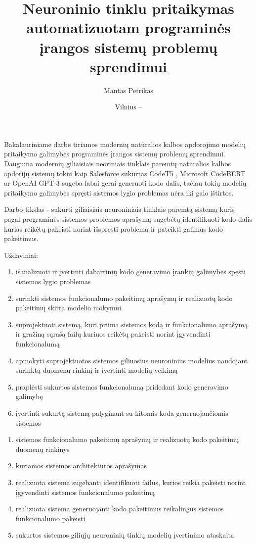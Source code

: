 \documentclass{VUMIFPSbakalaurinis}
\title{Neuroninio tinklu pritaikymas automatizuotam programinės įrangos sistemų problemų sprendimui}
\author{Mantas Petrikas}
\date{Vilnius – \the\year}
\begin{document}
\maketitle



Bakalauriniame darbe tiriamos modernių natūralios kalbos apdorojimo modelių pritaikymo galimybės programinės įrangos sistemų problemų sprendimui. 
Dauguma modernių giliaisiais neoriniais tinklais paremtų natūralios kalbos apdorijų sistemų tokiu kaip Salesforce sukurtas CodeT5 \cite{wang2021codet5}, Microsoft CodeBERT \cite{feng2020codebert} ar OpenAI GPT-3 \cite{brown2020language} sugeba labai gerai generuoti kodo dalis,
tačiau tokių modelių pritaikymo galimybės spręsti sistemos lygio problemas nėra iki galo ištirtos.


Darbo tikslas - sukurti giliaisiais neuroniniais tinklais paremtą sistemą kuris pagal programinės sistemos problemos aprašymą sugebėtų identifikuoti kodo dalis kurias reikėtų pakeisti norint išspręsti problemą ir pateikti galimus kodo pakeitimus.

Uždaviniai:
\begin{enumerate}
    \item išanalizuoti ir įvertinti dabartinių kodo generavimo įrankių galimybės spęsti sistemos lygio problemas
    \item surinkti sistemos funkcionalumo pakeitimų aprašymų ir realizuotų kodo pakeitimų skirta modelio mokymui
    \item suprojektuoti sistemą, kuri priima sistemos kodą ir funkcionalumo aprašymą ir gražiną sąrašą failų kuriuos reikėtų pakeisti norint įgyvendinti funkcionalumą
    \item apmokyti suprojektuotos sistemos giliuosius neuroninius modelius naudojant surinktą duomenų rinkinį ir įvertinti modelių veikimą
    \item praplėsti sukurtos sistemos funkcionalumą pridedant kodo generavimo galimybę 
    \item įvertinti sukurtą sistemą palyginant su kitomis koda generuojančiomis sistemos
\end{enumerate}

\begin{enumerate}
    \item sistemos funkcionalumo pakeitimų aprašymų ir realizuotų kodo pakeitimų duomenų rinkinys
    \item kuriamos sistemos architektūros aprašymas
    \item realizuota sistema sugebanti identifikuoti failus, kurios reikia pakeisti norint įgyvendinti sistemos funkcionalumo pakeitimą
    \item realizuota sistema generuojanti kodo pakeitimus reikalingus sistemos funkcionalumo pakeisti
    \item sukurtos sistemos giliųjų neuroninių tinklų modelių įvertinimo ataskaita 

\end{enumerate}
\end{document}
